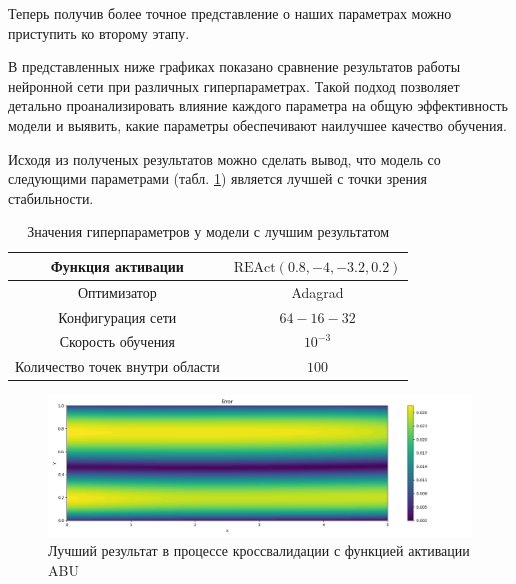 Теперь получив более точное представление о наших параметрах можно приступить
ко второму этапу.

В представленных ниже графиках показано сравнение результатов работы нейронной сети
при различных гиперпараметрах. Такой подход позволяет детально проанализировать
влияние каждого параметра на общую эффективность модели и выявить, какие параметры
обеспечивают наилучшее качество обучения.







Исходя из полученых результатов можно сделать вывод, что модель со следующими
параметрами (табл. \ref{table:couette_abu_best_params}) является лучшей с точки зрения стабильности.

\begin{table}[h!]
    \centering
    \begin{tabular}{ |c|c| } 
        \hline
        Функция активации & $\text{REAct}(0.8, -4, -3.2, 0.2)$ \\
        \hline
        Оптимизатор & Adagrad \\ 
        \hline
        Конфигурация сети & $64-16-32$ \\ 
        \hline
        Скорость обучения & $10^{-3}$ \\ 
        \hline
        Количество точек внутри области & $100$ \\ 
        \hline
    \end{tabular}
    \caption{Значения гиперпараметров у модели с лучшим результатом}
    \label{table:couette_abu_best_params}
\end{table}

\begin{figure}[ht]
    \includegraphics{data/couette_abu_error_best.png}
    \caption{Лучший результат в процессе кроссвалидации с функцией активации ABU}
    \label{fig:couette_abu_best}
\end{figure}